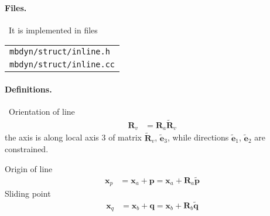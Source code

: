 \documentclass[10pt,dvips,fleqn,subeqn]{report}
\newcommand{\T}[1]{\bm{#1}}
\newcommand{\TT}[1]{\bm{#1}}
\begin{document}
\paragraph{Files.} \
It is implemented in files

\begin{tabular}{l}
\texttt{mbdyn/struct/inline.h} \\
\texttt{mbdyn/struct/inline.cc}
\end{tabular}

\paragraph{Definitions.} \
Orientation of line
\begin{align}
	\TT{R}_v
	&=
	\TT{R}_a \tilde{\TT{R}}_v
\end{align}
the axis is along local axis 3 of matrix $\tilde{\TT{R}}_v$,
$\tilde{\T{e}}_3$, while directions $\tilde{\T{e}}_1$, $\tilde{\T{e}}_2$
are constrained.

Origin of line
\begin{align}
	\T{x}_p
	&=
	\T{x}_a + \T{p}
	=
	\T{x}_a + \TT{R}_a \tilde{\T{p}}
\end{align}
Sliding point
\begin{align}
	\T{x}_q
	&=
	\T{x}_b + \T{q}
	=
	\T{x}_b + \TT{R}_b \tilde{\T{q}}
\end{align}
\end{document}
